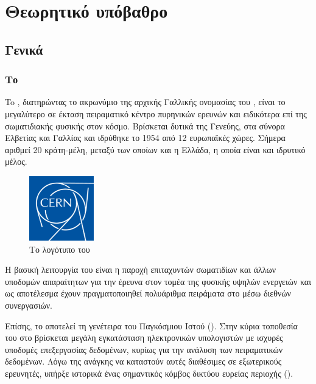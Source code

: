 \chapter{Θεωρητικό υπόβαθρο}

\section{Γενικά}
\subsection{Το }

To , διατηρώντας το ακρωνύμιο της αρχικής Γαλλικής ονομασίας του , είναι το μεγαλύτερο σε έκταση πειραματικό κέντρο πυρηνικών ερευνών και ειδικότερα επί της σωματιδιακής φυσικής στον κόσμο. 
Βρίσκεται δυτικά της Γενεύης, στα σύνορα Ελβετίας και Γαλλίας και ιδρύθηκε το 1954 από 12 ευρωπαϊκές χώρες. 
Σήμερα αριθμεί 20 κράτη-μέλη, μεταξύ των οποίων και η Ελλάδα, η οποία είναι και ιδρυτικό μέλος.

\begin{figure}[tph]
\includegraphics[width=0.25\textwidth]{images/CERNlogo.png}
\centering
\caption{Το λογότυπο του }
\label{img:CERNlogo}
\end{figure}

Η βασική λειτουργία του  είναι η παροχή επιταχυντών σωματιδίων και άλλων υποδομών απαραίτητων για την έρευνα στον τομέα της φυσικής υψηλών ενεργειών και ως αποτέλεσμα έχουν πραγματοποιηθεί πολυάριθμα πειράματα στο  μέσω διεθνών συνεργασιών.

Επίσης, το  αποτελεί τη γενέτειρα του Παγκόσμιου Ιστού ().
Στην κύρια τοποθεσία του στο  βρίσκεται μεγάλη εγκατάσταση ηλεκτρονικών υπολογιστών με ισχυρές υποδομές επεξεργασίας δεδομένων, κυρίως για την ανάλυση των πειραματικών δεδομένων. 
Λόγω της ανάγκης να καταστούν αυτές διαθέσιμες σε εξωτερικούς ερευνητές, υπήρξε ιστορικά ένας σημαντικός κόμβος δικτύου ευρείας περιοχής ().

